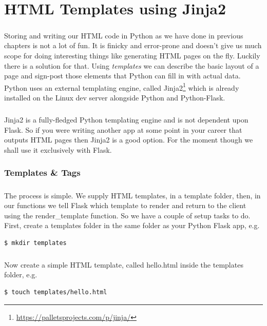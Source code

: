 \documentclass[12pt, a4paper, oneside]{book}
\begin{document}
\chapter{HTML Templates using Jinja2}
\label{style}
\paragraph{} Storing and writing our HTML code in Python as we have done in previous chapters is not a lot of fun. It is finicky and error-prone and doesn't give us much scope for doing interesting things like generating HTML pages on the fly. Luckily there is a solution for that. Using \emph{templates} we can describe the basic layout of a page and sign-post those elements that Python can fill in with actual data. Python uses an external templating engine, called Jinja2\footnote{\url{https://palletsprojects.com/p/jinja/}} which is already installed on the Linux dev server alongside Python and Python-Flask.

\paragraph{} Jinja2 is a fully-fledged Python templating engine and is not dependent upon Flask. So if you were writing another app at some point in your career that outputs HTML pages then Jinja2 is a good option. For the moment though we shall use it exclusively with Flask.


\subsection{Templates \& Tags}
\label{templates-tags}
\paragraph{} The process is simple. We supply HTML templates, in a template folder, then, in our functions we tell Flask which template to render and return to the client using the render\_template function. So we have a couple of setup tasks to do. First, create a templates folder in the same folder as your Python Flask app, e.g.

\begin{lstlisting}[style=DOS]
$ mkdir templates
\end{lstlisting}

\paragraph{} Now create a simple HTML template, called hello.html inside the templates folder, e.g.
\begin{lstlisting}[style=DOS]
$ touch templates/hello.html
\end{lstlisting}
\end{document}
